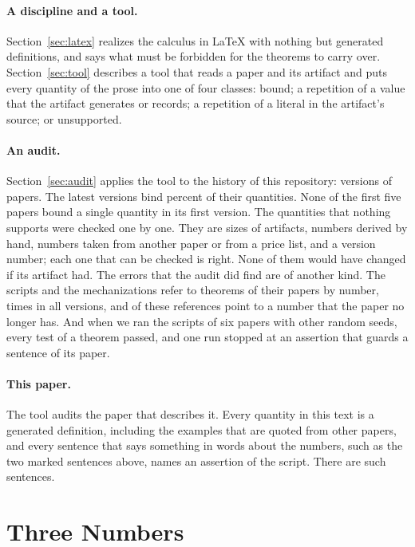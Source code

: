\documentclass[acmsmall,nonacm,screen]{acmart}
\newcommand{\claim}[2]{#2}
\begin{document}
\paragraph{A discipline and a tool.} Section~\ref{sec:latex} realizes the calculus in LaTeX
with nothing but generated definitions, and says what must be forbidden for the theorems to
carry over. Section~\ref{sec:tool} describes a tool that reads a paper and its artifact and
puts every quantity of the prose into one of four classes: bound; a repetition of a value
that the artifact generates or records; a repetition of a literal in the artifact's source;
or unsupported.

\paragraph{An audit.} Section~\ref{sec:audit} applies the tool to the history of this
repository: \exVersions{} versions of \exPapers{} papers. The latest versions bind
\exAllShare{} percent of their quantities. \claim{early-none}{None of the first five papers
bound a single quantity in its first version.} The \exAllUnsup{} quantities that nothing
supports were checked one by one. They are sizes of artifacts, numbers derived by hand,
numbers taken from another paper or from a price list, and a version number;
\claim{checked-right}{each one that can be checked is right}. None of them would have
changed if its artifact had. The errors that the audit did find are of another kind. The
scripts and the mechanizations refer to theorems of their papers by number, \exRefAll{} times
in all versions, and \exRefStale{} of these references point to a number that the paper no
longer has. And when we ran the scripts of six papers with other random seeds, every test of
a theorem passed, and one run stopped at an assertion that guards a sentence of its paper.

\paragraph{This paper.} The tool audits the paper that describes it. Every quantity in this
text is a generated definition, including the examples that are quoted from other papers,
and every sentence that says something in words about the numbers, such as the two marked
sentences above, names an assertion of the script. There are \exOwnClaims{} such sentences.

\section{Three Numbers}
\label{sec:three}
\end{document}
